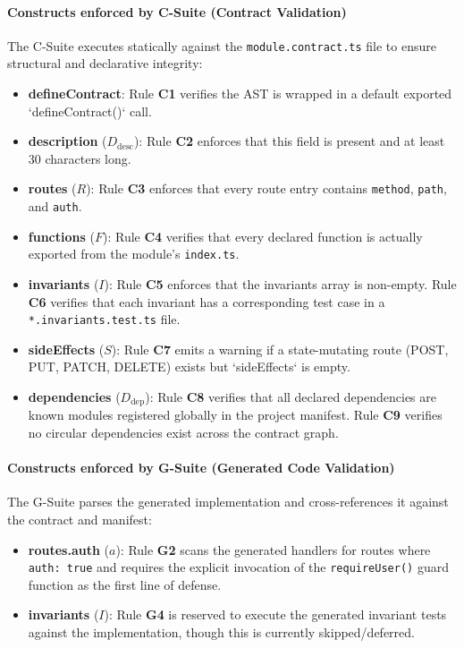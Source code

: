 \paragraph{Constructs enforced by C-Suite (Contract Validation)}
The C-Suite executes statically against the \texttt{module.contract.ts} file to ensure structural and declarative integrity:
\begin{itemize}
    \item \textbf{defineContract}: Rule \textbf{C1} verifies the AST is wrapped in a default exported `defineContract()` call.
    \item \textbf{description} ($D_{\text{desc}}$): Rule \textbf{C2} enforces that this field is present and at least 30 characters long.
    \item \textbf{routes} ($R$): Rule \textbf{C3} enforces that every route entry contains \texttt{method}, \texttt{path}, and \texttt{auth}.
    \item \textbf{functions} ($F$): Rule \textbf{C4} verifies that every declared function is actually exported from the module's \texttt{index.ts}.
    \item \textbf{invariants} ($I$): Rule \textbf{C5} enforces that the invariants array is non-empty. Rule \textbf{C6} verifies that each invariant has a corresponding test case in a \texttt{*.invariants.test.ts} file.
    \item \textbf{sideEffects} ($S$): Rule \textbf{C7} emits a warning if a state-mutating route (POST, PUT, PATCH, DELETE) exists but `sideEffects` is empty.
    \item \textbf{dependencies} ($D_{\text{dep}}$): Rule \textbf{C8} verifies that all declared dependencies are known modules registered globally in the project manifest. Rule \textbf{C9} verifies no circular dependencies exist across the contract graph.
\end{itemize}

\paragraph{Constructs enforced by G-Suite (Generated Code Validation)}
The G-Suite parses the generated implementation and cross-references it against the contract and manifest:
\begin{itemize}
    \item \textbf{routes.auth} ($a$): Rule \textbf{G2} scans the generated handlers for routes where \texttt{auth: true} and requires the explicit invocation of the \texttt{requireUser()} guard function as the first line of defense.
    \item \textbf{invariants} ($I$): Rule \textbf{G4} is reserved to execute the generated invariant tests against the implementation, though this is currently skipped/deferred.
\end{itemize}

